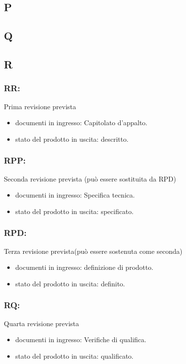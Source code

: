 \subsection*{P}
\subsection*{Q}
\subsection*{R}

\subsubsection*{RR:}  Prima revisione prevista 
\begin{itemize}
\item documenti in ingresso: Capitolato d'appalto.
\item stato del prodotto in uscita: descritto. 
\end{itemize}

\subsubsection*{RPP:} Seconda revisione prevista (pu\`o essere sostituita
da RPD)
\begin{itemize}
\item documenti in ingresso: Specifica tecnica.
\item stato del prodotto in uscita: specificato. 
\end{itemize}

\subsubsection*{RPD:} Terza revisione prevista(pu\`o essere sostenuta come
seconda)
\begin{itemize}
\item documenti in ingresso: definizione di prodotto.
\item stato del prodotto in uscita: definito. 
\end{itemize}

\subsubsection*{RQ:} Quarta revisione prevista
\begin{itemize}
\item documenti in ingresso: Verifiche di qualifica.
\item stato del prodotto in uscita: qualificato. 
\end{itemize}

